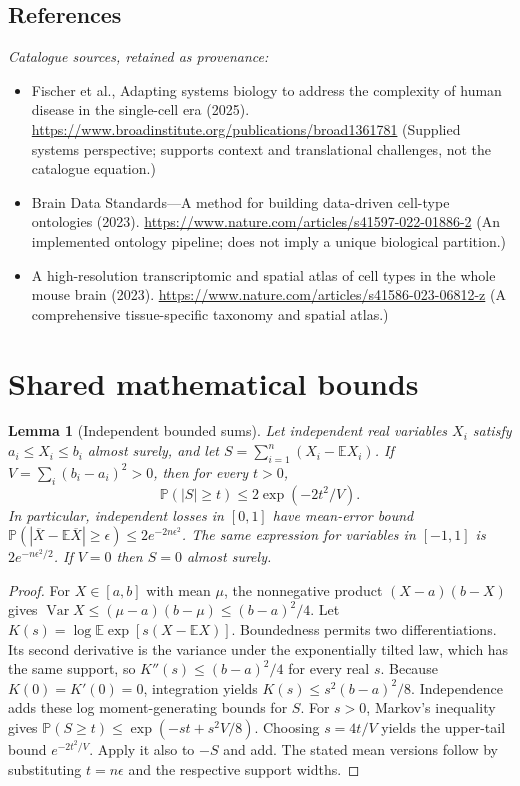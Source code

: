\documentclass[11pt]{article}
\newcommand{\E}{\mathbb E}
\newcommand{\Prob}{\mathbb P}
\DeclareMathOperator{\Var}{Var}
\providecommand{\E}{\mathbb E}
\providecommand{\Prob}{\mathbb P}
\providecommand{\Var}{\operatorname{Var}}
\newtheorem{sharedlemma}{Lemma}[section]
\begin{document}
\subsection{References}
\noindent\emph{Catalogue sources, retained as provenance:}
\begin{itemize}
\item Fischer et al., Adapting systems biology to address the complexity of human disease in the single-cell era (2025). \url{https://www.broadinstitute.org/publications/broad1361781} (Supplied systems perspective; supports context and translational challenges, not the catalogue equation.)
\item Brain Data Standards---A method for building data-driven cell-type ontologies (2023). \url{https://www.nature.com/articles/s41597-022-01886-2} (An implemented ontology pipeline; does not imply a unique biological partition.)
\item A high-resolution transcriptomic and spatial atlas of cell types in the whole mouse brain (2023). \url{https://www.nature.com/articles/s41586-023-06812-z} (A comprehensive tissue-specific taxonomy and spatial atlas.)
\end{itemize}
\clearpage


\appendix
\section{Shared mathematical bounds}\label{app:bounds}
\begin{sharedlemma}[Independent bounded sums]\label{lem:bounded}
Let independent real variables $X_i$ satisfy $a_i\leq X_i\leq b_i$ almost surely,
and let $S=\sum_{i=1}^n(X_i-\E X_i)$. If
$V=\sum_i(b_i-a_i)^2>0$, then for every $t>0$,
\[
 \Prob(|S|\geq t)\leq 2\exp(-2t^2/V).
\]
In particular, independent losses in $[0,1]$ have mean-error bound
$\Prob(|\overline X-\E\overline X|\geq\epsilon)
\leq2e^{-2n\epsilon^2}$. The same expression for variables in $[-1,1]$
is $2e^{-n\epsilon^2/2}$. If $V=0$ then $S=0$ almost surely.
\end{sharedlemma}
\begin{proof}
For $X\in[a,b]$ with mean $\mu$, the nonnegative product
$(X-a)(b-X)$ gives
$\Var X\leq(\mu-a)(b-\mu)\leq(b-a)^2/4$.
Let $K(s)=\log\E\exp[s(X-\E X)]$.
Boundedness permits two differentiations. Its second derivative is the variance
under the exponentially tilted law, which has the same support, so
$K''(s)\leq(b-a)^2/4$ for every real $s$.
Because $K(0)=K'(0)=0$, integration yields
$K(s)\leq s^2(b-a)^2/8$.
Independence adds these log moment-generating bounds for $S$.
For $s>0$, Markov's inequality gives
$\Prob(S\geq t)\leq\exp(-st+s^2V/8)$.
Choosing $s=4t/V$ yields the upper-tail bound $e^{-2t^2/V}$.
Apply it also to $-S$ and add. The stated mean versions follow by substituting
$t=n\epsilon$ and the respective support widths.
\end{proof}
\end{document}
